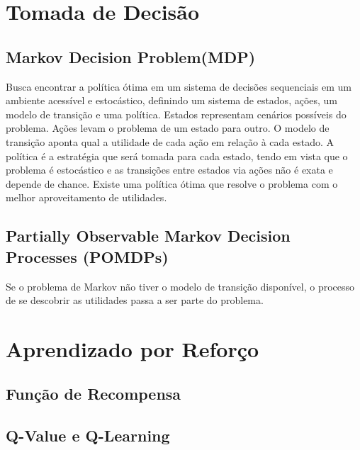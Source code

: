
\section{\label{sec:secao2}Tomada de Decisão}

\subsection{\label{sec:secao2.1}Markov Decision Problem(MDP)}

Busca encontrar a política ótima em um sistema de decisões sequenciais em um ambiente acessível e estocástico, definindo um sistema de estados, ações, um modelo de transição e uma política. Estados representam cenários possíveis do problema. Ações levam o problema de um estado para outro. O modelo de transição aponta qual a utilidade de cada ação em relação à cada estado. A política é a estratégia que será tomada para cada estado, tendo em vista que o problema é estocástico e as transições entre estados via ações não é exata e depende de chance. Existe uma política ótima que resolve o problema com o melhor aproveitamento de utilidades.

\subsection{\label{sec:secao2.2}Partially Observable Markov Decision Processes (POMDPs)}

Se o problema de Markov não tiver o modelo de transição disponível, o processo de se descobrir as utilidades passa a ser parte do problema. 


\section{\label{sec:secao3}Aprendizado por Reforço}

\subsection{\label{sec:secao3.1}Função de Recompensa}

\subsection{\label{sec:secao3.2}Q-Value e Q-Learning}

